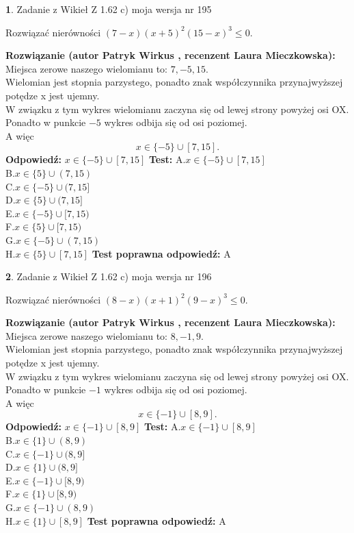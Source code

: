 \documentclass[12pt, a4paper]{article}
\theoremstyle{definition} %
\newtheorem{zad}{}
\newcommand{\zadStart}[1]{\begin{zad}#1\newline}
\newcommand{\zadStop}{\end{zad}}
\newcommand{\rozwStart}[2]{\noindent \textbf{Rozwiązanie (autor #1 , recenzent #2): }\newline}
\newcommand{\rozwStop}{\newline}
\newcommand{\odpStart}{\noindent \textbf{Odpowiedź:}\newline}
\newcommand{\odpStop}{\newline}
\newcommand{\testStart}{\noindent \textbf{Test:}\newline}
\newcommand{\testStop}{\newline}
\newcommand{\kluczStart}{\noindent \textbf{Test poprawna odpowiedź:}\newline}
\newcommand{\kluczStop}{\newline}
\begin{document}
\zadStart{Zadanie z Wikieł Z 1.62 c) moja wersja nr 195}

Rozwiązać nierówności $(7-x)(x+5)^{2}(15-x)^{3}\le0$.
\zadStop
\rozwStart{Patryk Wirkus}{Laura Mieczkowska}
Miejsca zerowe naszego wielomianu to: $7, -5, 15$.\\
Wielomian jest stopnia parzystego, ponadto znak współczynnika przy\linebreak najwyższej potędze x jest ujemny.\\ W związku z tym wykres wielomianu zaczyna się od lewej strony powyżej osi OX.\\
Ponadto w punkcie $-5$ wykres odbija się od osi poziomej.\\
A więc $$x \in \{-5\} \cup [7,15].$$
\rozwStop
\odpStart
$x \in \{-5\} \cup [7,15]$
\odpStop
\testStart
A.$x \in \{-5\} \cup [7,15]$\\
B.$x \in \{5\} \cup (7,15)$\\
C.$x \in \{-5\} \cup (7,15]$\\
D.$x \in \{5\} \cup (7,15]$\\
E.$x \in \{-5\} \cup [7,15)$\\
F.$x \in \{5\} \cup [7,15)$\\
G.$x \in \{-5\} \cup (7,15)$\\
H.$x \in \{5\} \cup [7,15]$
\testStop
\kluczStart
A
\kluczStop



\zadStart{Zadanie z Wikieł Z 1.62 c) moja wersja nr 196}

Rozwiązać nierówności $(8-x)(x+1)^{2}(9-x)^{3}\le0$.
\zadStop
\rozwStart{Patryk Wirkus}{Laura Mieczkowska}
Miejsca zerowe naszego wielomianu to: $8, -1, 9$.\\
Wielomian jest stopnia parzystego, ponadto znak współczynnika przy\linebreak najwyższej potędze x jest ujemny.\\ W związku z tym wykres wielomianu zaczyna się od lewej strony powyżej osi OX.\\
Ponadto w punkcie $-1$ wykres odbija się od osi poziomej.\\
A więc $$x \in \{-1\} \cup [8,9].$$
\rozwStop
\odpStart
$x \in \{-1\} \cup [8,9]$
\odpStop
\testStart
A.$x \in \{-1\} \cup [8,9]$\\
B.$x \in \{1\} \cup (8,9)$\\
C.$x \in \{-1\} \cup (8,9]$\\
D.$x \in \{1\} \cup (8,9]$\\
E.$x \in \{-1\} \cup [8,9)$\\
F.$x \in \{1\} \cup [8,9)$\\
G.$x \in \{-1\} \cup (8,9)$\\
H.$x \in \{1\} \cup [8,9]$
\testStop
\kluczStart
A
\kluczStop
\end{document}
